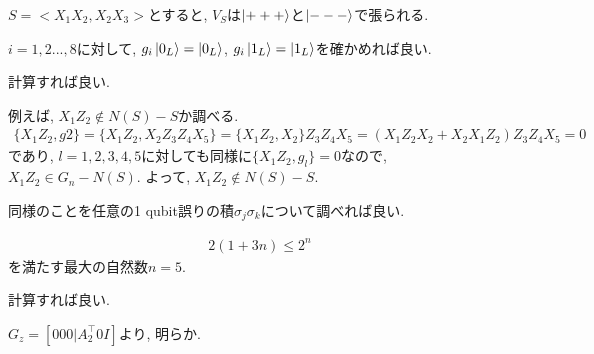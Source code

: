 \begin{ex}
    \label{ex10.46}
    $S = <X_1 X_2, X_2 X_3>$とすると, $V_S$は$\ket{+++}$と$\ket{---}$で張られる.
\end{ex}

\begin{ex}
    \label{ex10.47}
    $i = 1, 2 ... , 8$に対して,
    $g_i \ket{0_L} = \ket{0_L}$, $g_i \ket{1_L} = \ket{1_L}$を確かめれば良い.
\end{ex}

\begin{ex}
    \label{ex10.48}
    計算すれば良い.
\end{ex}

\begin{ex}
    \label{ex10.49}
    例えば, $X_1Z_2 \notin N(S) - S$か調べる.
    \begin{align*}
        \{X_1Z_2, g2\}
        = \{ X_1 Z_2, X_2 Z_3 Z_4 X_5\}
        = \{ X_1 Z_2 , X_2\}Z_3 Z_4 X_5
        = (X_1 Z_2 X_2 + X_2 X_1 Z_2)Z_3 Z_4 X_5
        = 0
    \end{align*}
    であり, $l = 1, 2,3,4,5$に対しても同様に$\{X_1Z_2, g_l\} = 0$なので, $X_1Z_2 \in G_n - N(S)$. よって, $X_1Z_2 \notin N(S) - S$.
    \par
    同様のことを任意の1 qubit誤りの積$\sigma_j \sigma_k$について調べれば良い.
\end{ex}

\begin{ex}
    \label{ex10.50}
    \begin{align*}
        2(1+3n) \leq 2^n
    \end{align*}
    を満たす最大の自然数$n = 5$.
\end{ex}

\begin{ex}
    \label{ex10.51}
\end{ex}

\begin{ex}
    \label{ex10.52}
    計算すれば良い.
\end{ex}

\begin{ex}
    \label{ex10.53}
    $G_z =[000|A_2^\top 0 I]$より, 明らか.
\end{ex}

